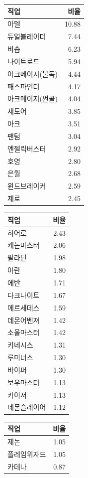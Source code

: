 \documentclass[
]{article}
\begin{document}
\begin{table}[H]

\centering
\begin{tabular}[t]{lr}
\toprule
직업 & 비율\\
\midrule
아델 & 10.88\\
듀얼블레이더 & 7.44\\
비숍 & 6.23\\
나이트로드 & 5.94\\
아크메이지(불독) & 4.44\\
\addlinespace
패스파인더 & 4.17\\
아크메이지(썬콜) & 4.04\\
섀도어 & 3.85\\
아크 & 3.51\\
팬텀 & 3.04\\
\addlinespace
엔젤릭버스터 & 2.92\\
호영 & 2.80\\
은월 & 2.68\\
윈드브레이커 & 2.59\\
제로 & 2.45\\
\bottomrule
\end{tabular}
\centering
\begin{tabular}[t]{lr}
\toprule
직업 & 비율\\
\midrule
히어로 & 2.43\\
캐논마스터 & 2.06\\
팔라딘 & 1.98\\
아란 & 1.80\\
에반 & 1.71\\
\addlinespace
다크나이트 & 1.67\\
메르세데스 & 1.59\\
데몬어벤져 & 1.42\\
소울마스터 & 1.42\\
키네시스 & 1.31\\
\addlinespace
루미너스 & 1.30\\
바이퍼 & 1.30\\
보우마스터 & 1.13\\
카이저 & 1.13\\
데몬슬레이어 & 1.12\\
\bottomrule
\end{tabular}
\centering
\begin{tabular}[t]{lr}
\toprule
직업 & 비율\\
\midrule
제논 & 1.05\\
플레임위자드 & 1.05\\
카데나 & 0.87\\

\end{tabular}
\end{table}
\end{document}
